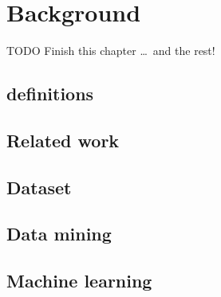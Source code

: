 \chapter{Background}  \label{ch:theory}

TODO Finish this chapter \ldots\ and the rest!

\section{definitions}

\section{Related work} 

\section{Dataset}

\section{Data mining}


\section{Machine learning}
